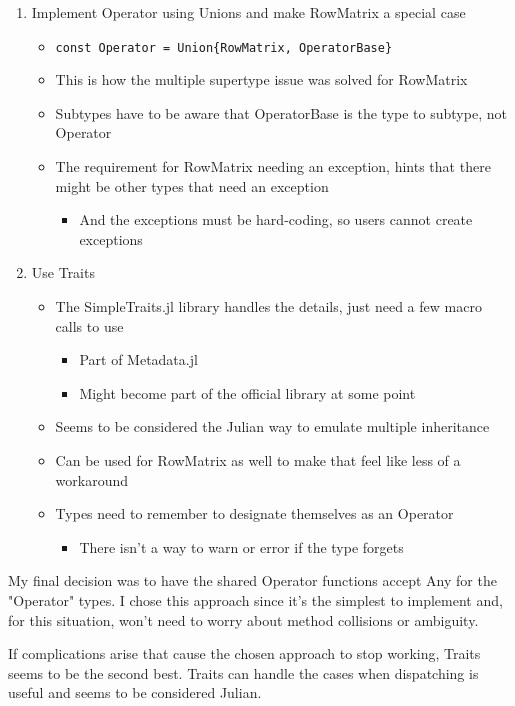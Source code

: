 \documentclass{article}
\begin{document}
\begin{enumerate}
	\item Implement Operator using Unions and make RowMatrix a special case
	\begin{itemize}
		\item \verb|const Operator = Union{RowMatrix, OperatorBase}|
		\item This is how the multiple supertype issue was solved for RowMatrix
		\item Subtypes have to be aware that OperatorBase is the type to subtype, not Operator
		\item The requirement for RowMatrix needing an exception, hints that there might be other types that need an exception
		\begin{itemize}
			\item And the exceptions must be hard-coding, so users cannot create exceptions
		\end{itemize}
	\end{itemize}		 

	\item Use Traits
	\begin{itemize}
		\item The SimpleTraits.jl library handles the details, just need a few macro calls to use
		\begin{itemize}
			\item Part of Metadata.jl
			\item Might become part of the official library at some point
		\end{itemize}
		\item Seems to be considered the Julian way to emulate multiple inheritance
		\item Can be used for RowMatrix as well to make that feel like less of a workaround
		\item Types need to remember to designate themselves as an Operator
		\begin{itemize}
			\item There isn't a way to warn or error if the type forgets
		\end{itemize}
	\end{itemize}
\end{enumerate}

My final decision was to have the shared Operator functions accept Any for the "Operator" types.  I chose this approach since it's the simplest to implement and, for this situation, won't need to worry about method collisions or ambiguity.

If complications arise that cause the chosen approach to stop working, Traits seems to be the second best.  Traits can handle the cases when dispatching is useful and seems to be considered Julian.
\end{document}
